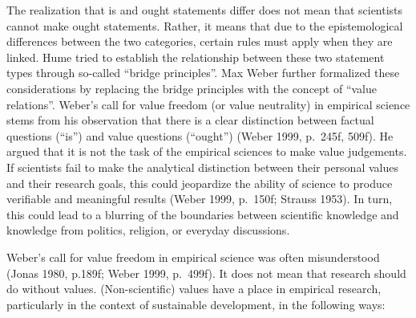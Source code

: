 \documentclass[
  a4paper,
  openany]{book}
\begin{document}
The realization that is and ought statements differ does not mean that
scientists cannot make ought statements. Rather, it means that due to
the epistemological differences between the two categories, certain
rules must apply when they are linked. Hume tried to establish the
relationship between these two statement types through so-called
``bridge principles''. Max Weber further formalized these considerations
by replacing the bridge principles with the concept of ``value
relations''. Weber's call for value freedom (or value neutrality) in
empirical science stems from his observation that there is a clear
distinction between factual questions (``is'') and value questions
(``ought'') (Weber 1999, p.~245f, 509f). He argued that it is not the
task of the empirical sciences to make value judgements. If scientists
fail to make the analytical distinction between their personal values
and their research goals, this could jeopardize the ability of science
to produce verifiable and meaningful results (Weber 1999, p.~150f;
Strauss 1953). In turn, this could lead to a blurring of the boundaries
between scientific knowledge and knowledge from politics, religion, or
everyday discussions.

Weber's call for value freedom in empirical science was often
misunderstood (Jonas 1980, p.189f; Weber 1999, p.~499f). It does not
mean that research should do without values. (Non-scientific) values
have a place in empirical research, particularly in the context of
sustainable development, in the following ways:
\end{document}
